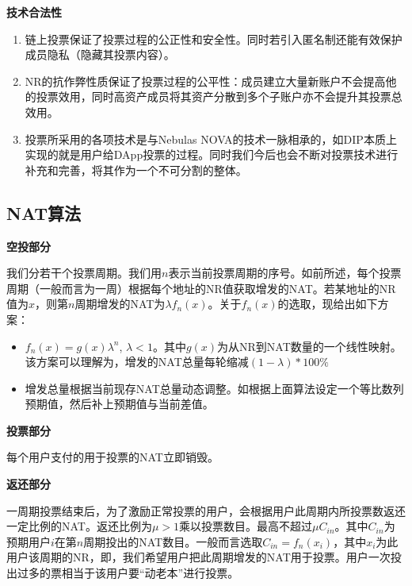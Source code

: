 \textbf{技术合法性}
\begin{enumerate}
\item 链上投票保证了投票过程的公正性和安全性。同时若引入匿名制还能有效保护成员隐私（隐藏其投票内容）。
\item NR的抗作弊性质保证了投票过程的公平性：成员建立大量新账户不会提高他的投票效用，同时高资产成员将其资产分散到多个子账户亦不会提升其投票总效用。
\item 投票所采用的各项技术是与Nebulas NOVA的技术一脉相承的，如DIP本质上实现的就是用户给DApp投票的过程。同时我们今后也会不断对投票技术进行补充和完善，将其作为一个不可分割的整体。
\end{enumerate}

\subsection{NAT算法}
\textbf{空投部分}

我们分若干个投票周期。我们用$n$表示当前投票周期的序号。如前所述，每个投票周期（一般而言为一周）根据每个地址的NR值获取增发的NAT。若某地址的NR值为$x$，则第$n$周期增发的NAT为$\lambda f_n(x)$。关于$f_n(x)$的选取，现给出如下方案：


\begin{itemize}
	\item $f_n(x)=g(x)\lambda^n$, $\lambda<1$。其中$g(x)$为从NR到NAT数量的一个线性映射。该方案可以理解为，增发的NAT总量每轮缩减$(1-\lambda)*100\%$
	\item 增发总量根据当前现存NAT总量动态调整。如根据上面算法设定一个等比数列预期值，然后补上预期值与当前差值。
\end{itemize}


\textbf{投票部分}

每个用户支付的用于投票的NAT立即销毁。

\textbf{返还部分}

一周期投票结束后，为了激励正常投票的用户，会根据用户此周期内所投票数返还一定比例的NAT。返还比例为$\mu>1$乘以投票数目。最高不超过$\mu C_{in}$。其中$C_{in}$为预期用户$i$在第$n$周期投出的NAT数目。一般而言选取$C_{in}=f_n(x_i)$，其中$x_i$为此用户该周期的NR，即，我们希望用户把此周期增发的NAT用于投票。用户一次投出过多的票相当于该用户要“动老本”进行投票。

